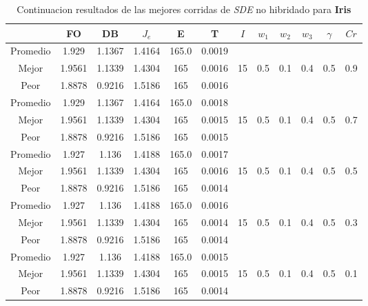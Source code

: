 \begin{table}[h!]
    \footnotesize
    \begin{center}
        \begin{tabular}{|c|c|c|c|c|c|c|c|c|c|c|c|}
        \hline
            & {\bf FO} & {\bf DB} & $J_e$ & {\bf E} & {\bf T} & $I$ & $w_1$ & $w_2$ & $w_3$ & $\gamma$ & $Cr$ \\
        \hline
        \hline
            Promedio  & 1.929 & 1.1367 & 1.4164 & 165.0 & 0.0019 &  &  &  &  &  & \\
            \cline{1-6}
            Mejor & 1.9561 & 1.1339  & 1.4304 & 165 & 0.0016 & 15 & 0.5 & 0.1 & 0.4 & 0.5 & 0.9\\
            \cline{1-6}
            Peor & 1.8878 & 0.9216  & 1.5186 & 165 & 0.0016 &  &  &  &  &  & \\
        \hline
        \hline
            Promedio  & 1.929 & 1.1367 & 1.4164 & 165.0 & 0.0018 &  &  &  &  &  & \\
            \cline{1-6}
            Mejor & 1.9561 & 1.1339  & 1.4304 & 165 & 0.0015 & 15 & 0.5 & 0.1 & 0.4 & 0.5 & 0.7\\
            \cline{1-6}
            Peor & 1.8878 & 0.9216  & 1.5186 & 165 & 0.0015 &  &  &  &  &  & \\
        \hline
        \hline
            Promedio  & 1.927 & 1.136 & 1.4188 & 165.0 & 0.0017 &  &  &  &  &  & \\
            \cline{1-6}
            Mejor & 1.9561 & 1.1339  & 1.4304 & 165 & 0.0016 & 15 & 0.5 & 0.1 & 0.4 & 0.5 & 0.5\\
            \cline{1-6}
            Peor & 1.8878 & 0.9216  & 1.5186 & 165 & 0.0014 &  &  &  &  &  & \\
        \hline
        \hline
            Promedio  & 1.927 & 1.136 & 1.4188 & 165.0 & 0.0016 &  &  &  &  &  & \\
            \cline{1-6}
            Mejor & 1.9561 & 1.1339  & 1.4304 & 165 & 0.0014 & 15 & 0.5 & 0.1 & 0.4 & 0.5 & 0.3\\
            \cline{1-6}
            Peor & 1.8878 & 0.9216  & 1.5186 & 165 & 0.0014 &  &  &  &  &  & \\
        \hline
        \hline
            Promedio  & 1.927 & 1.136 & 1.4188 & 165.0 & 0.0015 &  &  &  &  &  & \\
            \cline{1-6}
            Mejor & 1.9561 & 1.1339  & 1.4304 & 165 & 0.0015 & 15 & 0.5 & 0.1 & 0.4 & 0.5 & 0.1\\
            \cline{1-6}
            Peor & 1.8878 & 0.9216  & 1.5186 & 165 & 0.0014 &  &  &  &  &  & \\
        \hline
        \end{tabular}
        \caption{Continuacion resultados de las mejores corridas de \emph{SDE} no hibridado para {\bf Iris}}
        \label{tb:tablesdealgcsvc}
    \end{center}
\end{table}
